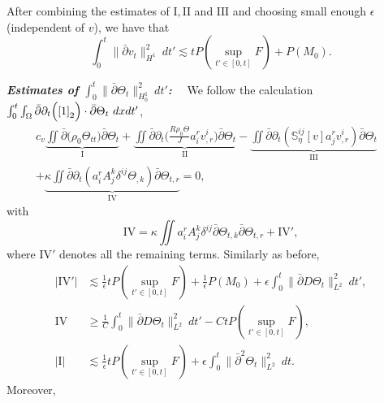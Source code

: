\documentclass[12pt,a4paper]{amsart}
\numberwithin{equation}{section}
\theoremstyle{plain}
\theoremstyle{definition}
\newcommand{\bpartial}{\bar{\partial}}
\begin{document}
After combining the estimates of $\mathrm{I}, \mathrm{II}$ and $\mathrm{III}$ and choosing small enough $\epsilon$ (independent of $v$), we have that 
\begin{equation}\label{vtx}
\int_{0}^{t}\|\bpartial v_t\|_{H^1}^2\ dt'\lesssim tP(\sup\limits_{t'\in[0,t]}F)+P( M_0).
\end{equation}

\vspace{0.3cm}

\textsl{\textbf{Estimates of $\int_{0}^{t}\|\bpartial \Theta_{t}\|_{H_0^1}^2\ dt'$:}}~~
We follow the calculation 
$\int_{0}^{t}\int_{\Omega}\bpartial\partial_t \Big(\eqref{1}_2\Big)\cdot  \bpartial \Theta_t\ dx dt'$,
\begin{align*}
c_v\underbrace{\iint \bpartial  \Big(\rho_0\Theta_{tt}\Big)\bpartial \Theta_t}_{\mathrm{I}}
+\underbrace{\iint  \bpartial \partial_t \Big(\frac{R\rho_0\Theta}{J} a^r_i v^i_{,r}\Big) \bpartial \Theta_t}_{\mathrm{II}}
-\underbrace{\iint \bpartial \partial_t (\mathbb{S}^{ij}_{\eta}[v] a^r_j v^i_{,r})  \bpartial \Theta_t}_{\mathrm{III}}&\\
+\underbrace{\kappa\iint \bpartial \partial_t(a^r_i A^k_j \delta^{ij}\Theta_{,k}) \bpartial \Theta_{t,r}}_{\mathrm{IV}}=0,
\qquad\qquad\qquad\qquad&
\end{align*}
with
$$
\mathrm{IV}=\kappa \iint a^r_i A^k_j \delta^{ij} \bpartial \Theta_{t,k}
\bpartial \Theta_{t,r}+\mathrm{IV}',
$$
where $\mathrm{IV}'$ denotes all the remaining terms.
Similarly as before,
\begin{align*}
|\mathrm{IV}'|
&\lesssim \frac{1}{\epsilon}tP(\sup\limits_{t'\in[0,t]}F)+\frac{1}{\epsilon} P(M_0) +\epsilon \int_{0}^{t}\|\bpartial D\Theta_t\|_{L^2}^2\ dt',\\
\mathrm{IV}
&\geq \frac{1}{C} \int_{0}^{t} \|\bpartial D\Theta_{t}\|_{L^2}^2 \ dt'-CtP(\sup\limits_{t'\in[0,t]}F),\\
|\mathrm{I}| &\lesssim \frac{1}{\epsilon}tP(\sup\limits_{t'\in[0,t]}F)
           + \epsilon \int_{0}^{t}  \|\bpartial^2 \Theta_t\|_{L^2} ^2\ dt.  
\end{align*}
Moreover,
\end{document}
